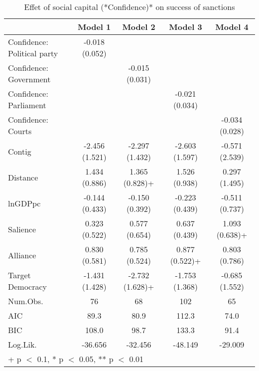 \begin{table}

\caption{\label{tab:unnamed-chunk-5}\label{tab2} Effet of social capital (*Confidence)* on success of sanctions}
\centering
\begin{tabular}[t]{lcccc}
\toprule
  & Model 1 & Model 2 & Model 3 & Model 4\\
\midrule
Confidence: Political party & -0.018 (0.052) &  &  & \\
Confidence: Government &  & -0.015 (0.031) &  & \\
Confidence: Parliament &  &  & -0.021 (0.034) & \\
Confidence: Courts &  &  &  & -0.034 (0.028)\\
Contig & -2.456 (1.521) & -2.297 (1.432) & -2.603 (1.597) & -0.571 (2.539)\\
Distance & 1.434 (0.886) & 1.365 (0.828)+ & 1.526 (0.938) & 0.297 (1.495)\\
lnGDPpc & -0.144 (0.433) & -0.150 (0.392) & -0.223 (0.439) & -0.511 (0.737)\\
Salience & 0.323 (0.522) & 0.577 (0.654) & 0.637 (0.439) & 1.093 (0.638)+\\
Alliance & 0.830 (0.581) & 0.785 (0.524) & 0.877 (0.522)+ & 0.803 (0.786)\\
Target Democracy & -1.431 (1.428) & -2.732 (1.628)+ & -1.753 (1.368) & -0.685 (1.552)\\
\midrule
Num.Obs. & 76 & 68 & 102 & 65\\
AIC & 89.3 & 80.9 & 112.3 & 74.0\\
BIC & 108.0 & 98.7 & 133.3 & 91.4\\
Log.Lik. & -36.656 & -32.456 & -48.149 & -29.009\\
\bottomrule
\multicolumn{5}{l}{\textsuperscript{} + p $<$ 0.1, * p $<$ 0.05, ** p $<$ 0.01}\\
\end{tabular}
\end{table}
